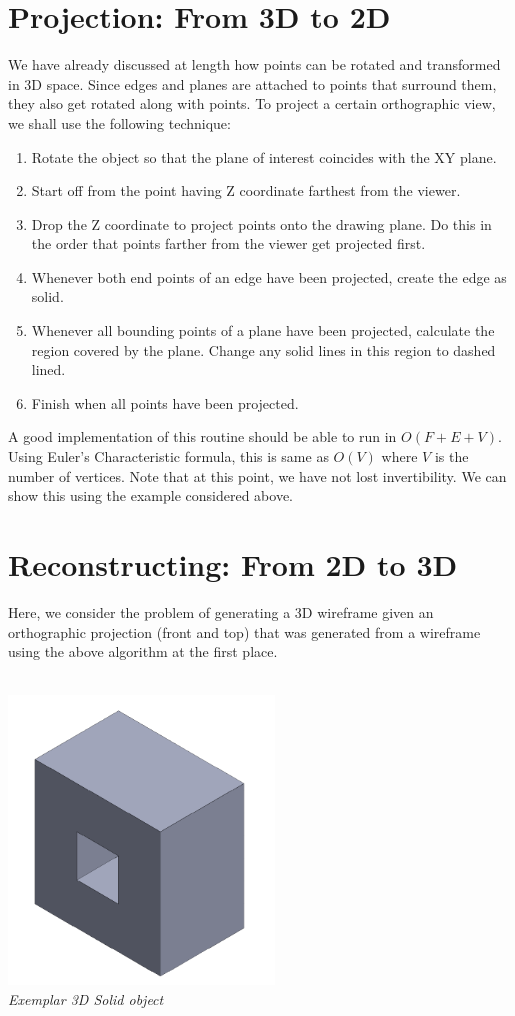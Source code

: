 \documentclass[
11pt, %
english, %
singlespacing, %
headsepline, %
]{MastersDoctoralThesis} %
\begin{document}
\section{Projection: From 3D to 2D}
We have already discussed at length how points can be rotated and transformed in 3D space. Since edges and planes are attached to points that surround them, they also get rotated along with points. To project a certain orthographic view, we shall use the following technique:
\begin{enumerate}
\item Rotate the object so that the plane of interest coincides with the XY plane.
\item Start off from the point having Z coordinate farthest from the viewer. 
\item Drop the Z coordinate to project points onto the drawing plane. Do this in the order that points farther from the viewer get projected first.
\item Whenever both end points of an edge have been projected, create the edge as solid.
\item Whenever all bounding points of a plane have been projected, calculate the region covered by the plane. Change any solid lines in this region to dashed lined.
\item Finish when all points have been projected.
\end{enumerate}
A good implementation of this routine should be able to run in $O(F+E+V)$. Using Euler’s Characteristic formula, this is same as $ O(V)$ where $V$ is the number of vertices.
Note that at this point, we have not lost invertibility. We can show this using the example considered above.





\section{Reconstructing: From 2D to 3D}

Here, we consider the problem of generating a 3D wireframe given an orthographic projection (front and top) that was generated from a wireframe using the above algorithm at the first place.\\ \\
\begin{center}
\includegraphics[width = 200pt]{solid} \\
\emph{Exemplar 3D Solid object}
\end{center}
\end{document}

